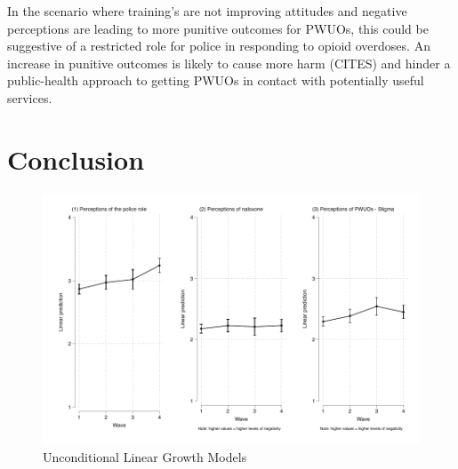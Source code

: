 In the scenario where training's are not improving attitudes and negative perceptions are leading to more punitive outcomes for PWUOs, this could be suggestive of a restricted role for police in responding to opioid overdoses. An increase in punitive outcomes is likely to cause more harm (CITES) and hinder a public-health approach to getting PWUOs in contact with potentially useful services.   

\section{Conclusion}




\begin{landscape}

\end{landscape}


\begin{figure}
    \centering
    \caption{\centering Unconditional Linear Growth Models}
    \includegraphics{figures/growth_models.pdf}
\end{figure}



\begin{landscape}
    
\end{landscape}


